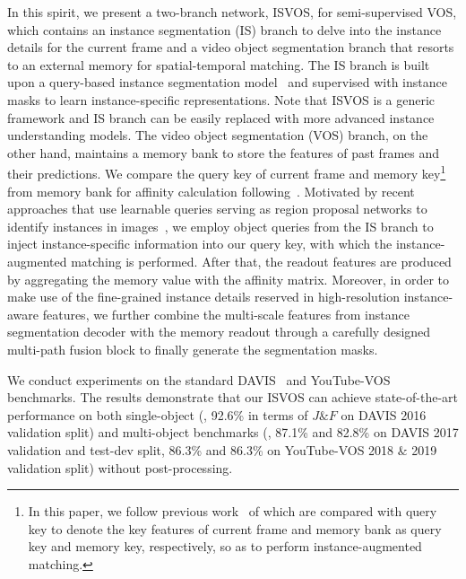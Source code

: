 \documentclass[10pt,twocolumn,letterpaper]{article}
\newcommand{\system}{ISVOS\xspace}
\begin{document}
In this spirit, we present a two-branch network, \system, for semi-supervised VOS, which contains an instance segmentation (IS) branch to delve into the instance details for the current frame and a video object segmentation branch that resorts to an external memory for spatial-temporal matching. The IS branch is built upon a query-based instance segmentation model~\cite{cheng2022masked} and supervised with instance masks to learn instance-specific representations. Note that \system is a generic framework and IS branch can be easily replaced with more advanced instance understanding models.
The video object segmentation (VOS) branch, on the other hand, maintains a memory bank to store the features of past frames and their predictions. We compare the query key of current frame and memory key\footnote{In this paper, we follow previous work~\cite{oh2019video,cheng2021stcn} of which are compared with query key to denote the key features of current frame and memory bank as query key and memory key, respectively, so as to perform instance-augmented matching.} from memory bank for affinity calculation following~\cite{oh2019video,seong2021hierarchical,cheng2021stcn,cheng2022xmem}. Motivated by recent approaches that use learnable queries serving as region proposal networks to identify instances in images~\cite{fang2021instances,cheng2021per,yang2021tracking,cheng2022masked}, we employ object queries from the IS branch to inject instance-specific information into our query key, with which the instance-augmented matching is performed. After that, the readout features are produced by aggregating the memory value with the affinity matrix. Moreover, in order to make use of the fine-grained instance details reserved in high-resolution instance-aware features, we further combine the multi-scale features from instance segmentation decoder with the memory readout through a carefully designed multi-path fusion block to finally generate the segmentation masks.

We conduct experiments on the standard DAVIS~\cite{perazzi2016benchmark,pont20172017} and YouTube-VOS~\cite{xu2018YouTube} benchmarks. The results demonstrate that our \system can achieve state-of-the-art performance on both single-object (\ie, 92.6\% in terms of $J\&F$ on DAVIS 2016 validation split) and multi-object benchmarks (\ie, 87.1\% and 82.8\% on DAVIS 2017 validation and test-dev split, 86.3\% and 86.3\% on YouTube-VOS 2018 $\&$ 2019 validation split) without post-processing. 
\end{document}
